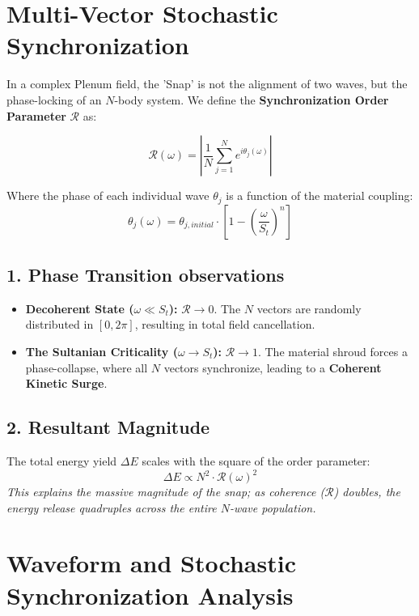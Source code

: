 \documentclass[11pt]{article}
\begin{document}
\section*{Multi-Vector Stochastic Synchronization}

In a complex Plenum field, the 'Snap' is not the alignment of two waves, but the phase-locking of an $N$-body system. We define the \textbf{Synchronization Order Parameter} $\mathcal{R}$ as:

\begin{equation}
    \mathcal{R}(\omega) = \left| \frac{1}{N} \sum_{j=1}^{N} e^{i\theta_j(\omega)} \right|
\end{equation}

Where the phase of each individual wave $\theta_j$ is a function of the material coupling:
\begin{equation}
    \theta_j(\omega) = \theta_{j,initial} \cdot \left[ 1 - \left( \frac{\omega}{S_t} \right)^n \right]
\end{equation}

\subsection*{1. Phase Transition observations}
\begin{itemize}
    \item \textbf{Decoherent State ($\omega \ll S_t$):} $\mathcal{R} \to 0$. The $N$ vectors are randomly distributed in $[0, 2\pi]$, resulting in total field cancellation.
    \item \textbf{The Sultanian Criticality ($\omega \to S_t$):} $\mathcal{R} \to 1$. The material shroud forces a phase-collapse, where all $N$ vectors synchronize, leading to a \textbf{Coherent Kinetic Surge}.
\end{itemize}

\subsection*{2. Resultant Magnitude}
The total energy yield $\Delta E$ scales with the square of the order parameter:
\begin{equation}
    \Delta E \propto N^2 \cdot \mathcal{R}(\omega)^2
\end{equation}
\textit{This explains the massive magnitude of the snap; as coherence ($\mathcal{R}$) doubles, the energy release quadruples across the entire $N$-wave population.}

\section{Waveform and Stochastic Synchronization Analysis}
\end{document}
